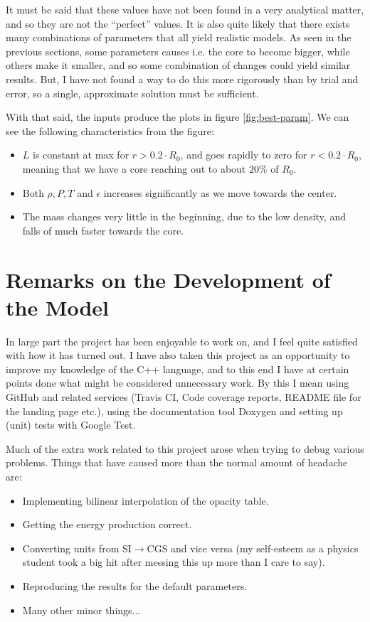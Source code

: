\documentclass[11pt,twocolumn]{article}
\begin{document}
It must be said that these values have not been found in a very
analytical matter, and so they are not the ``perfect'' values. It is also
quite likely that there exists many combinations of parameters that
all yield realistic models. As seen in the previous sections, some
parameters causes i.e. the core to become bigger, while others make it
smaller, and so some combination of changes could yield similar
results. But, I have not found a way to do this more rigorously than
by trial and error, so a single, approximate solution must be
sufficient.

With that said, the inputs produce the plots in figure
\ref{fig:best-param}. We can see the following characteristics from
the figure:

\begin{itemize}
  \item $L$ is constant at max for $r>0.2\cdot R_0$, and goes rapidly
    to zero for $r<0.2 \cdot R_0$, meaning that we have a core
    reaching out to about $20\%$ of $R_0$.
  \item Both $\rho,P,T$ and $\epsilon$ increases significantly as we move
    towards the center.
  \item The mass changes very little in the beginning, due to the low
    density, and falls of much faster towards the core. 
\end{itemize}





\section{Remarks on the Development of the Model}
In large part the project has been enjoyable to work on, and I feel
quite satisfied with how it has turned out. I have also taken this
project as an opportunity to improve my knowledge of the C++ language,
and to this end I have at certain points done what might be considered
unnecessary work. By this I mean using GitHub and related services
(Travis CI, Code coverage reports, README file for the landing page
etc.), using the documentation tool Doxygen and setting up
(unit) tests with Google Test. 

Much of the extra work related to this project arose when trying to
debug various problems. Things that have caused more than the normal
amount of headache are:

\begin{itemize}
  \item Implementing bilinear interpolation of the opacity table.
  \item Getting the energy production correct.
  \item Converting units from SI$\rightarrow$CGS and vice versa (my
    self-esteem as a physics student took a big hit after messing this
    up more than I care to say).
  \item Reproducing the results for the default parameters.
  \item Many other minor things...
\end{itemize}
\end{document}
